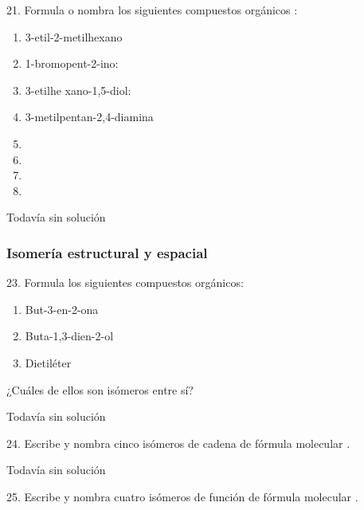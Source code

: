 \documentclass[twocolumn]{article}
\begin{document}
\begin{exercise}
  21. Formula o nombra los siguientes compuestos orgánicos :
  \begin{enumerate}
    \item 3-etil-2-metilhexano
    \item 1-bromopent-2-ino:
    \item 3-etilhe xano-1,5-diol:
    \item 3-metilpentan-2,4-diamina
    \item {}
    \item {}
    \item {}
    \item {}
  \end{enumerate}
\end{exercise}

\begin{solution}[print=false]
  Todavía sin solución
\end{solution}

\subsubsection{Isomería estructural y espacial}

\begin{exercise}
  23. Formula los siguientes compuestos orgánicos:
  \begin{enumerate}
    \item But-3-en-2-ona
    \item Buta-1,3-dien-2-ol
    \item Dietiléter
  \end{enumerate}
  ¿Cuáles de ellos son isómeros entre sí?
\end{exercise}

\begin{solution}[print=false]
  Todavía sin solución
\end{solution}

\begin{exercise}
  24. Escribe y nombra cinco isómeros de cadena de fórmula molecular .
\end{exercise}

\begin{solution}[print=false]
  Todavía sin solución
\end{solution}

\begin{exercise}
  25. Escribe y nombra cuatro isómeros de función de fórmula molecular .
\end{exercise}
\end{document}
